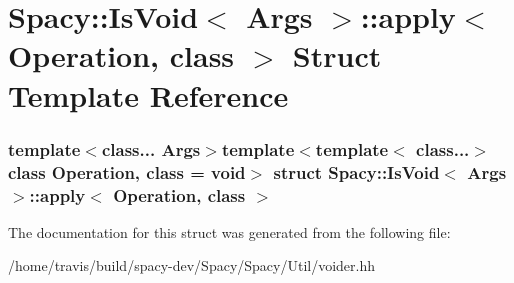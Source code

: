 \hypertarget{structSpacy_1_1IsVoid_1_1apply}{\section{\-Spacy\-:\-:\-Is\-Void$<$ \-Args $>$\-:\-:apply$<$ \-Operation, class $>$ \-Struct \-Template \-Reference}
\label{structSpacy_1_1IsVoid_1_1apply}
}
\subsubsection*{template$<$class... \-Args$>$template$<$template$<$ class...$>$ class \-Operation, class = void$>$ struct Spacy\-::\-Is\-Void$<$ Args $>$\-::apply$<$ Operation, class $>$}



\-The documentation for this struct was generated from the following file\-:\begin{DoxyCompactItemize}
\item 
/home/travis/build/spacy-\/dev/\-Spacy/\-Spacy/\-Util/voider.\-hh\end{DoxyCompactItemize}
